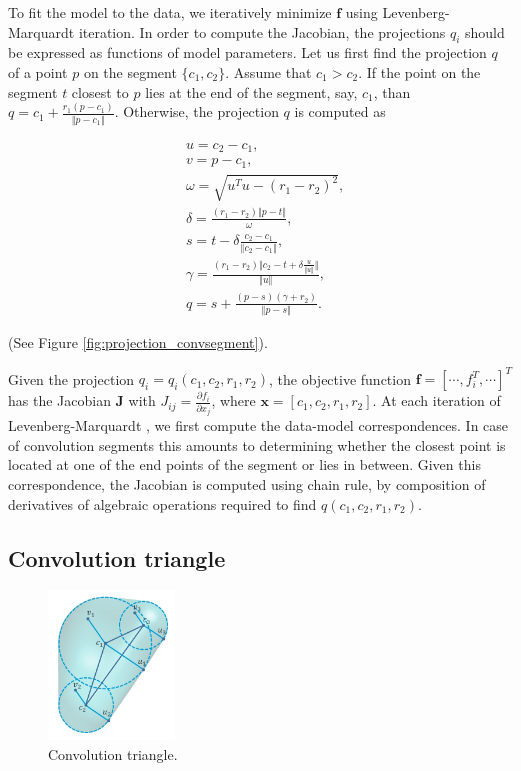 To fit the model to the data, we iteratively minimize $\textbf{f}$ using Levenberg-Marquardt iteration. In order to compute the Jacobian, the projections $q_i$ should be expressed as functions of model parameters. Let us first find the projection $q$ of a point $p$ on the segment $\{c_1, c_2\}$. Assume that $c_1 > c_2$. If the point on the segment $t$ closest to $p$ lies at the end of the segment, say, $c_1$, than $q = c_1 + \frac{r_1  (p - c_1)}{\Vert p - c_1 \Vert}$. 
Otherwise, the projection $q$ is computed as 

\begin{align*}
& u = c_2 - c_1, \\
& v = p - c_1, \\
& \omega = \sqrt{u^T u - (r_1 - r_2)^2}, \\
&  \delta =  \frac{(r_1 - r_2) \Vert p - t \Vert}{\omega}, \\
&   s = t - \delta  \frac{c_2 - c_1} {\Vert c_2 - c_1 \Vert}, \\
&  \gamma = \frac{(r_1 - r_2)   {\Vert c_2 - t + \delta  \frac{u} {\Vert u \Vert}} \Vert} {\Vert u \Vert}, \\
&   q = s +\frac{ (p - s) (\gamma + r_2) }{ \Vert p - s \Vert } .
\end{align*}

(See Figure \ref{fig:projection_convsegment}).

Given the projection $q_i = q_i(c_1, c_2, r_1, r_2)$, the objective function $\textbf{f} = [\cdots, f_i^T, \cdots]^T$  has the Jacobian $\textbf{J}$ with $J_{ij} = \frac{\partial{f_i}}{\partial{x_j}}$, where $\textbf{x} = [c_1, c_2, r_1, r_2]$.  At each iteration of Levenberg-Marquardt , we first compute the data-model correspondences. In case of convolution segments this amounts to determining whether the closest point is located at one of the end points of the segment or lies in between. Given this correspondence, the Jacobian is computed using chain rule, by composition of derivatives of algebraic operations required to find $q(c_1, c_2, r_1, r_2)$.




\subsection{Convolution triangle}


\begin{figure}[h!] 
	\centering
	\hspace{-2em}
	\includegraphics[width=0.3\textwidth]{figures/convtriangle.png}
	\caption{Convolution triangle.}
	\label{fig:convtriangle}
\end{figure}

